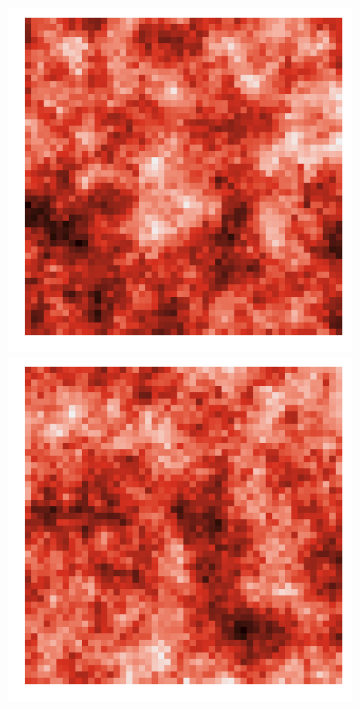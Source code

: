 \documentclass{article}
\begin{document}
\begin{figure}[t!]
\begin{subfigure}{0.3\textwidth}
	\end{subfigure}
	\begin{subfigure}{0.3\textwidth}
		\includegraphics[width=\linewidth]{figures/p_realistic6}\\
		\includegraphics[width=\linewidth]{figures/p_realistic7}\\

\end{subfigure}
\end{figure}
\end{document}
